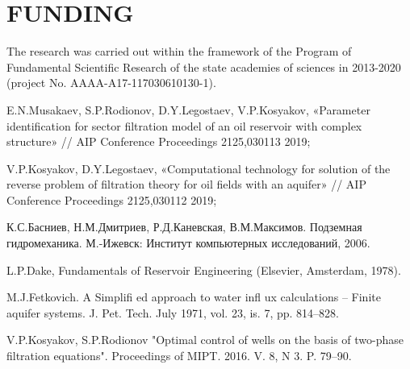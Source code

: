 \documentclass{article}
\begin{document}
\section{FUNDING}
The research was carried out within the framework of the Program of Fundamental Scientific Research of the state academies of sciences in 2013-2020 (project No. AAAA-A17-117030610130-1).

%
%
\begin{thebibliography}{99}
 E.N.Musakaev, S.P.Rodionov, D.Y.Legostaev, V.P.Kosyakov,  «Parameter identification for sector filtration model of an oil reservoir with complex structure» // AIP Conference Proceedings 2125,030113 2019;

 V.P.Kosyakov, D.Y.Legostaev,  «Computational technology for solution of the reverse problem of filtration theory for oil fields with an aquifer» // AIP Conference Proceedings 2125,030112 2019;

 К.С.Басниев, Н.М.Дмитриев, Р.Д.Каневская, В.М.Максимов. Подземная гидромеханика.  М.-Ижевск: Институт компьютерных исследований, 2006. 

 L.P.Dake, Fundamentals of Reservoir Engineering (Elsevier, Amsterdam, 1978).

 M.J.Fetkovich. A Simplifi ed approach to water infl ux calculations – Finite aquifer systems. J. Pet. Tech. July 1971, vol. 23, is. 7, pp. 814–828.

 V.P.Kosyakov, S.P.Rodionov "Optimal control of wells on the basis of two-phase filtration equations". Proceedings of MIPT. 2016. V. 8, N 3. P. 79–90.


\end{thebibliography}
\end{document}
